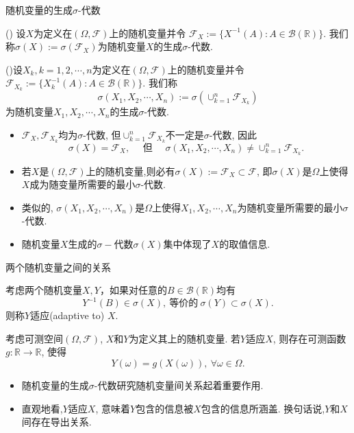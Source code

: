 \begin{frame}{随机变量的生成$\sigma$-代数}
	\begin{defi}
	() 设$X$为定义在$(\Omega,\mathcal{F})$上的随机变量并令
	$\mathcal{F}_X:=\{X^{-1}(A):A\in \mathcal{B}(\mathbb{R})\}$. 我们称$\sigma(X):=\sigma\left(\mathcal{F}_{X}\right)$为随机变量$X$的生成$\sigma$-代数.
	\end{defi}
	\pause

\begin{defi}
  ()设$X_k, k=1,2,\cdots, n$为定义在$(\Omega,\mathcal{F})$上的随机变量并令
  $\mathcal{F}_{X_k}:=\{X_k^{-1}(A):A\in \mathcal{B}(\mathbb{R})\}$. 我们称\[\sigma(X_1,X_2,\cdots,X_n):=\sigma\left(\cup_{k=1}^n\mathcal{F}_{X_k}\right)\]为随机变量$X_1,X_2,\cdots,X_n$的生成$\sigma$-代数.
\end{defi}
\pause
\begin{itemize}[<+-|alert@+>]
	\item $\mathcal{F}_{X}, \mathcal{F}_{X_k}$均为$\sigma$-代数, 但$\cup_{k=1}^n\mathcal{F}_{X_k}$不一定是$\sigma$-代数, 因此
	\[\sigma(X)=\mathcal{F}_X, \quad \mbox{ 但  } \quad  \sigma(X_1,X_2,\cdots,X_n)\neq \cup_{k=1}^n\mathcal{F}_{X_k}.\]
	\item 若$X$是$(\Omega,\mathcal{F})$上的随机变量,则必有$\sigma(X):=\mathcal{F}_X\subset\mathcal{F}$, 即$\sigma(X)$是$\Omega$上使得$X$成为随变量所需要的最小$\sigma$-代数.
	\item 类似的, $\sigma(X_1,X_2,\cdots,X_n)$是$\Omega$上使得$X_1,X_2,\cdots,X_n$为随机变量所需要的最小$\sigma$-代数.
	\item 随机变量$X$生成的$\sigma-$代数$\sigma(X)$集中体现了$X$的取值信息.
\end{itemize}
\end{frame}
\begin{frame}{两个随机变量之间的关系}
\begin{defi}
考虑两个随机变量$X, Y$，如果对任意的$B\in\mathcal{B}(\mathbb{R})$均有
\[
Y^{-1}(B) \in \sigma(X),\ \mbox{等价的}\ \sigma(Y)\subset \sigma(X).
\]则称$Y$适应(adaptive to) $X$.
\end{defi}

\pause

\begin{thm}
考虑可测空间$(\Omega, \mathcal{F})$, $X$和$Y$为定义其上的随机变量. 若$Y$适应$X$, 则存在可测函数$g: \mathbb{R} \rightarrow \mathbb{R}$, 使得
\[
Y(\omega)=g(X(\omega)),  \ \forall \omega \in \Omega .
\]
\end{thm}
\pause
\begin{rmk}
	\begin{itemize}[<+-|alert@+>]
		\item 随机变量的生成$\sigma$-代数研究随机变量间关系起着重要作用.
		\item 直观地看,$Y$适应$X$, 意味着$Y$包含的信息被$X$包含的信息所涵盖. 换句话说,$Y$和$X$间存在导出关系.
	\end{itemize}
\end{rmk}



\end{frame}
